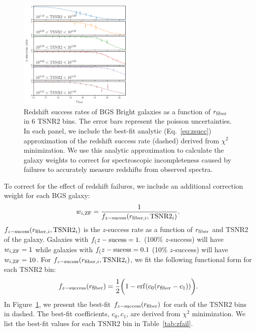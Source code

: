\begin{figure}
\begin{center}
    \includegraphics[width=0.5\textwidth]{figs/bgs_bright_rfib_tsnr2_zsuccess.pdf}
    \caption{
        Redshift success rates of BGS Bright galaxies  as a function of 
        $r_{\rm fiber}$ in 6 TSNR2 bins. 
        The error bars represent the poisson uncertainties.
        In each panel, we include the best-fit analytic (Eq.~\ref{eq:zsucc})
        approximation of the redshift success rate (dashed) derived from
        $\chi^2$ minimization. 
        We use this analytic approximation to calculate the galaxy weights to
        correct for spectroscopic incompleteness caused by failures to
        accurately measure redshifts from observed spectra.
    }\label{fig:zfail1}
\end{center}
\end{figure}

To correct for the effect of redshift failures, we include an additional
correction weight for each BGS galaxy: 
\begin{equation}
    w_{i, {\rm ZF}} = \frac{1}{f_{z-{\rm sucess}}(r_{{\rm fiber},i}, {\rm
    TSNR2}_i)}.
\end{equation} 
$f_{z-{\rm sucess}}(r_{{\rm fiber},i}, {\rm TSNR2}_i)$ is the $z$-success rate
as a function of $r_{\rm fiber}$ and TSNR2 of the galaxy. 
Galaxies with $f_(z-{\rm sucess} = 1.$ (100\% $z$-success) will have 
$w_{i, {\rm ZF}} = 1$ while galaxies with $f_(z-{\rm sucess} = 0.1$ 
(10\% $z$-success) will have $w_{i, {\rm ZF}} = 10$.
For $f_{z-{\rm sucess}}(r_{{\rm fiber},i}, {\rm TSNR2}_i)$, we fit the
following functional form for each TSNR2 bin: 
\begin{equation} \label{eq:zsucc}
    f_{z-{\rm success}}(r_{\rm fiber}) = \frac{1}{2} \bigg(1-{\rm erf}(c_0
    (r_{\rm fiber} - c_1))\bigg).
\end{equation}
In Figure~\ref{fig:zfail1}, we present the best-fit 
$f_{z-{\rm success}}(r_{\rm fiber})$ for each of the TSNR2 bins in dashed. 
The best-fit coefficients, $c_0, c_1$, are derived from $\chi^2$ minimization.
We list the best-fit values for each TSNR2 bin in Table~\ref{tab:zfail}. 

